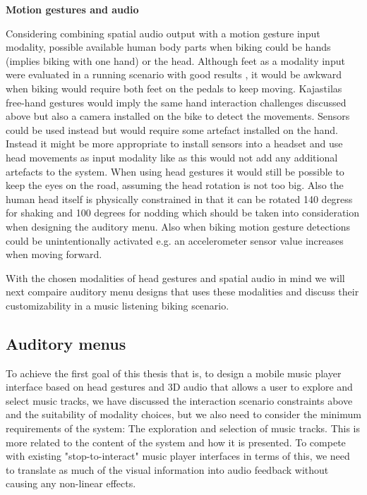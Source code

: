 \textbf{Motion gestures and audio}

Considering combining spatial audio output with a motion gesture input modality, possible available human body parts when biking could be hands (implies biking with one hand) or the head. Although feet as a modality input were evaluated in a running scenario with good results \cite{smus_running_2010}, it would be awkward when biking would require both feet on the pedals to keep moving. Kajastilas free-hand gestures \cite{kajastila_eyes-free_2013} would imply the same hand interaction challenges discussed above but also a camera installed on the bike to detect the movements. Sensors could be used instead but would require some artefact installed on the hand. Instead it might be more appropriate to install sensors into a headset and use head movements as input modality like \cite{park_gaze-directed_2011, brewster_multimodal_2003} as this would not add any additional artefacts to the system. When using head gestures it would still be possible to keep the eyes on the road, assuming the head rotation is not too big. Also the human head itself is physically constrained in that it can be rotated 140 degress for shaking and 100 degrees for nodding \cite{lopresti_neck_2000} which should be taken into consideration when designing the auditory menu. Also when biking motion gesture detections could be unintentionally activated e.g. an accelerometer sensor value increases when moving forward.

With the chosen modalities of head gestures and spatial audio in mind we will next compaire auditory menu designs that uses these modalities and discuss their customizability in a music listening biking scenario.

\subsection{Auditory menus}
To achieve the first goal of this thesis that is, to design a mobile music player interface based on head gestures and 3D audio that allows a user to explore and select music tracks, we have discussed the interaction scenario constraints above and the suitability of modality choices, but we also need to consider the minimum requirements of the system: The exploration and selection of music tracks. This is more related to the content of the system and how it is presented. To compete with existing "stop-to-interact" music player interfaces in terms of this, we need to translate as much of the visual information into audio feedback without causing any non-linear effects.

